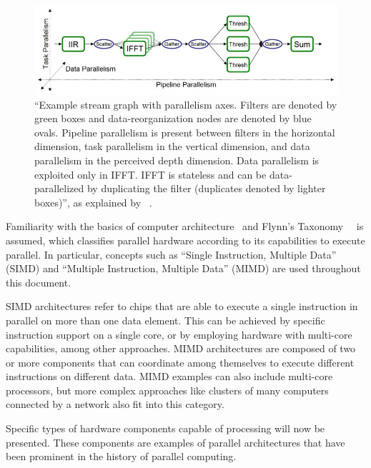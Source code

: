 \begin{figure}[!h]
\begin{center}
\centerline{\includegraphics[width=\columnwidth]{img/parallelism}}
\caption[Example stream graph with parallelism axes.]{``Example stream graph with parallelism axes. Filters are denoted by green boxes and data-reorganization nodes are denoted by blue ovals. Pipeline parallelism is present between filters in the horizontal dimension, task parallelism in the vertical dimension, and data parallelism in the perceived depth dimension. Data parallelism is exploited only in IFFT. IFFT is stateless and can be data-parallelized by duplicating the filter (duplicates denoted by lighter boxes)'', as explained by ~\cite{1_gordon_thies_li_sung_zhang_wong_amarasinghe_2015}.}
\label{f:parallelism}
\end{center}
\end{figure}

Familiarity with the basics of computer architecture~\cite{hennessy2012computer} and Flynn's Taxonomy~\cite{flynn1966very}~\cite{tsuchiyama2010opencl} is assumed, which classifies parallel hardware according to its capabilities to execute parallel. In particular, concepts such as ``Single Instruction, Multiple Data'' (\gls{SIMD}) and ``Multiple Instruction, Multiple Data'' (\gls{MIMD}) are used throughout this document.

SIMD architectures refer to chips that are able to execute a single instruction in parallel on more than one data element. This can be achieved by specific instruction support on a single core, or by employing hardware with multi-core capabilities, among other approaches. MIMD architectures are composed of two or more components that can coordinate among themselves to execute different instructions on different data. MIMD examples can also include multi-core processors, but more complex approaches like clusters of many computers connected by a network also fit into this category.

Specific types of hardware components capable of processing will now be presented. These components are examples of parallel architectures that have been prominent in the history of parallel computing. 

